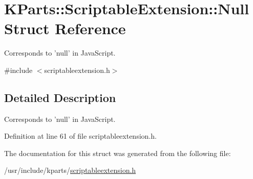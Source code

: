 \hypertarget{structKParts_1_1ScriptableExtension_1_1Null}{\section{K\+Parts\+:\+:Scriptable\+Extension\+:\+:Null Struct Reference}
\label{structKParts_1_1ScriptableExtension_1_1Null}
}


Corresponds to 'null' in Java\+Script.  




{\ttfamily \#include $<$scriptableextension.\+h$>$}



\subsection{Detailed Description}
Corresponds to 'null' in Java\+Script. 

Definition at line 61 of file scriptableextension.\+h.



The documentation for this struct was generated from the following file\+:\begin{DoxyCompactItemize}
\item 
/usr/include/kparts/\hyperlink{scriptableextension_8h}{scriptableextension.\+h}\end{DoxyCompactItemize}
